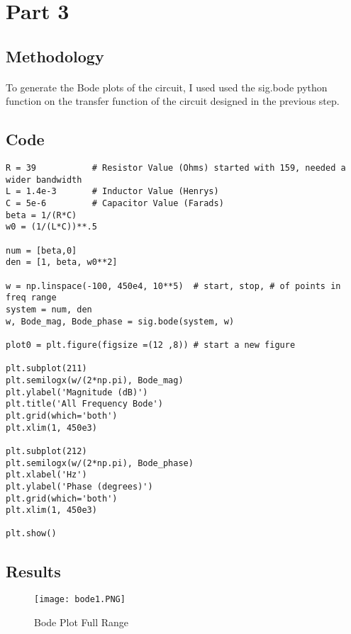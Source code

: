 \section{Part 3}
\subsection{Methodology}
\paragraph{}
To generate the Bode plots of the circuit, I used used the sig.bode python function on the transfer function of the circuit designed in the previous step.

\subsection{Code}
\begin{scriptsize}
\begin{lstlisting}
R = 39           # Resistor Value (Ohms) started with 159, needed a wider bandwidth
L = 1.4e-3       # Inductor Value (Henrys) 
C = 5e-6         # Capacitor Value (Farads)
beta = 1/(R*C)
w0 = (1/(L*C))**.5

num = [beta,0]             
den = [1, beta, w0**2]

w = np.linspace(-100, 450e4, 10**5)  # start, stop, # of points in freq range
system = num, den
w, Bode_mag, Bode_phase = sig.bode(system, w)

plot0 = plt.figure(figsize =(12 ,8)) # start a new figure        

plt.subplot(211)
plt.semilogx(w/(2*np.pi), Bode_mag) 
plt.ylabel('Magnitude (dB)')
plt.title('All Frequency Bode')
plt.grid(which='both')
plt.xlim(1, 450e3)

plt.subplot(212)
plt.semilogx(w/(2*np.pi), Bode_phase)   
plt.xlabel('Hz') 
plt.ylabel('Phase (degrees)')
plt.grid(which='both')
plt.xlim(1, 450e3)

plt.show()
\end{lstlisting}
\end{scriptsize}

\subsection{Results}
 \begin{figure}[H]
   \centering
   \texttt{[image: bode1.PNG]}
   \caption{Bode Plot Full Range}
 \end{figure}
 

